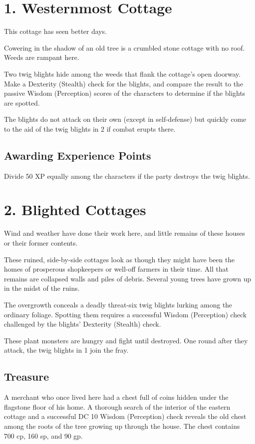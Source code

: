 \documentclass[10pt,a4paper,twoside,bg=print,twocolumn,openany,nodeprecatedcode]{dndbook}
\begin{document}
\section{1. Westernmost Cottage}
This cottage has seen better days.

\begin{DndReadAloud}{}
Cowering in the shadow of an old tree is a crumbled stone cottage with no roof. Weeds are rampant here.

\end{DndReadAloud}

Two twig blights hide among the weeds that flank the cottage's open doorway. Make a Dexterity (Stealth) check for the blights, and compare the result to the passive Wisdom (Perception) scores of the characters to determine if the blights are spotted.

The blights do not attack on their own (except in self-defense) but quickly come to the aid of the twig blights in 2 if combat erupts there.

\subsection{Awarding Experience Points}
Divide 50 XP equally among the characters if the party destroys the twig blights.

\section{2. Blighted Cottages}
Wind and weather have done their work here, and little remains of these houses or their former contents.

\begin{DndReadAloud}{}
These ruined, side-by-side cottages look as though they might have been the homes of prosperous shopkeepers or well-off farmers in their time. All that remains are collapsed walls and piles of debris. Several young trees have grown up in the midst of the ruins.

\end{DndReadAloud}

The overgrowth conceals a deadly threat-six twig blights lurking among the ordinary foliage. Spotting them requires a successful Wisdom (Perception) check challenged by the blights' Dexterity (Stealth) check.

These plant monsters are hungry and fight until destroyed. One round after they attack, the twig blights in 1 join the fray.

\subsection{Treasure}
A merchant who once lived here had a chest full of coins hidden under the flagstone floor of his home. A thorough search of the interior of the eastern cottage and a successful DC 10 Wisdom (Perception) check reveals the old chest among the roots of the tree growing up through the house. The chest contains 700 cp, 160 sp, and 90 gp.
\end{document}
